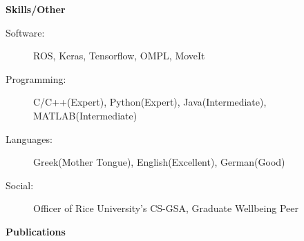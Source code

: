 \documentclass[letterpaper,11pt]{article}
\newcommand{\resheading}[1]{{\large \colorbox{mygrey}{\begin{minipage}{\textwidth}{\textbf{#1 \vphantom{p\^{E}}}}\end{minipage}}}}
\begin{document}
\resheading{Skills/Other}
\begin{description}
    \item[Software:] ROS, Keras, Tensorflow, OMPL, MoveIt 
    \item[Programming:] C/C++(Expert), Python(Expert), Java(Intermediate), MATLAB(Intermediate) 
    \item[Languages:] Greek(Mother Tongue), English(Excellent), German(Good) 
    \item[Social:] Officer of Rice University's CS-GSA, Graduate Wellbeing Peer
\end{description}
\newpage

\resheading{Publications }
\begingroup
	\renewcommand{\section}[2]{}%
\end{document}
